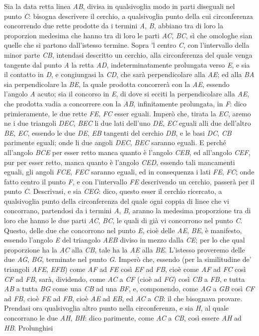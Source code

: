 \documentclass[11pt,twoside,openany]{book}
\begin{document}
Sia la data retta linea \emph{AB}, divisa in qualsivoglia modo in parti diseguali nel punto \emph{C}: bisogna descrivere il cerchio, a qualsivoglia punto della cui circonferenza concorrendo due rette prodotte da i termini \emph{A}, \emph{B}, abbiano tra di loro la proporzion medesima che hanno tra di loro le parti \emph{AC}, \emph{BC}, sì che omologhe sian quelle che si partono dall'istesso termine. Sopra 'l centro \emph{C}, con l'intervallo della minor parte \emph{CB}, intendasi descritto un cerchio, alla circonferenza del quale venga tangente dal punto \emph{A} la retta \emph{AD}, indeterminatamente prolungata verso \emph{E}, e sia il contatto in \emph{D}, e congiungasi la \emph{CD}, che sarà perpendicolare alla \emph{AE}; ed alla \emph{BA} sia perpendicolare la \emph{BE}, la quale prodotta concorrerà con la \emph{AE}, essendo l'angolo \emph{A} acuto; sia il concorso in \emph{E}, di dove si ecciti la perpendicolare alla \emph{AE}, che prodotta vadia a concorrere con la \emph{AB}, infinitamente prolungata, in \emph{F}: dico primieramente, le due rette \emph{FE}, \emph{FC} esser eguali. Imperò che, tirata la \emph{EC}, aremo ne i due triangoli \emph{DEC}, \emph{BEC} li due lati dell'uno \emph{DE}, \emph{EC} eguali alli due dell'altro \emph{BE}, \emph{EC}, essendo le due \emph{DE}, \emph{EB} tangenti del cerchio \emph{DB}, e le basi \emph{DC}, \emph{CB} parimente eguali; onde li due angoli \emph{DEC}, \emph{BEC} saranno eguali. E perché all'angolo \emph{BCE} per esser retto manca quanto è l'angolo \emph{CEB}, ed all'angolo \emph{CEF}, pur per esser retto, manca quanto è l'angolo \emph{CED}, essendo tali mancamenti eguali, gli angoli \emph{FCE}, \emph{FEC} saranno eguali, ed in consequenza i lati \emph{FE}, \emph{FC}; onde fatto centro il punto \emph{F}, e con l'intervallo \emph{FE} descrivendo un cerchio, passerà per il punto \emph{C}. Descrivasi, e sia \emph{CEG}: dico, questo esser il cerchio ricercato, a qualsivoglia punto della circonferenza del quale ogni coppia di linee che vi concorrano, partendosi da i termini \emph{A}, \emph{B}, aranno la medesima proporzione tra di loro che hanno le due parti \emph{AC}, \emph{BC}, le quali di già vi concorrono nel punto \emph{C}. Questo, delle due che concorrono nel punto \emph{E}, cioè delle \emph{AE}, \emph{BE}, è manifesto, essendo l'angolo \emph{E} del triangolo \emph{AEB} diviso in mezzo dalla \emph{CE}; per lo che qual proporzione ha la \emph{AC} alla \emph{CB}, tale ha la \emph{AE} alla \emph{BE}. L'istesso proveremo delle due \emph{AG}, \emph{BG}, terminate nel punto \emph{G}. Imperò che, essendo (per la similitudine de' triangoli \emph{AFE}, \emph{EFB}) come \emph{AF} ad \emph{FE} così \emph{EF} ad \emph{FB}, cioè come \emph{AF} ad \emph{FC} così \emph{CF} ad \emph{FB}, sarà, dividendo, come \emph{AC} a \emph{CF} (cioè ad \emph{FG}) così \emph{CB} a \emph{FB}, e tutta \emph{AB} a tutta \emph{BG} come una \emph{CB} ad una \emph{BF}, e, componendo, come \emph{AG} a \emph{GB} così \emph{CF} ad \emph{FB}, cioè \emph{FE} ad \emph{FB}, cioè \emph{AE} ad \emph{EB}, ed \emph{AC} a \emph{CB}: il che bisognava provare. Prendasi ora qualsivoglia altro punto nella circonferenza, e sia \emph{H}, al quale concorrano le due \emph{AH}, \emph{BH}: dico parimente, come \emph{AC} a \emph{CB}, così essere \emph{AH} ad \emph{HB}. Prolunghisi 
\end{document}
